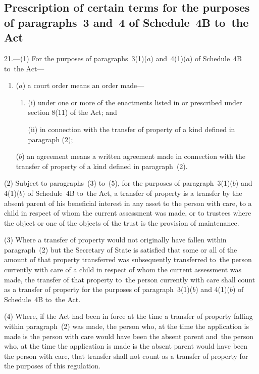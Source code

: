 \documentclass[12pt,a4paper]{article}
\begin{document}
\subsection[21. Prescription of certain terms for the
purposes of paragraphs~3 and~4 of Schedule~4B to~the Act]{Prescription of certain terms for the
purposes of paragraphs~3 and~4 of Schedule~4B to~the Act}

21.—(1) For the purposes
of paragraphs~3(1)($a$) and~4(1)($a$) of Schedule~4B to~the Act—
\begin{enumerate}\item[]
($a$) a court order means an order made—
\begin{enumerate}\item[]
(i) under one or more of the enactments listed in or prescribed under section
8(11) of the Act; and

(ii) in connection with the transfer of property of a kind defined in paragraph
(2);
\end{enumerate}

($b$) an agreement means a written agreement made in connection with the transfer
of property of a kind defined in paragraph~(2).
\end{enumerate}

(2) Subject to paragraphs~(3) to~(5), for the purposes of paragraph~3(1)($b$) and
4(1)($b$) of Schedule~4B to~the Act, a transfer of property is a transfer by the
absent parent of his beneficial interest in any asset to the person with care,
to a child in respect of whom the current assessment was made, or to trustees
where the object or one of the objects of the trust is the provision of
maintenance.%

(3) Where a transfer of property would not originally have fallen within
paragraph~(2) but the Secretary of State is satisfied that some or all of the
amount of that property transferred was subsequently transferred to~the person
currently with care of a child in respect of whom the current assessment was
made, the transfer of that property to~the person currently with care shall
count as a transfer of property for the purposes of paragraph~3(1)($b$) and
4(1)($b$) of Schedule~4B to~the Act.

(4) Where, if the Act had been in force at the time a transfer of property
falling within paragraph~(2) was made, the person who, at the time the
application is made is the person with care would have been the absent parent
and~the person who, at the time the application is made is the absent parent
would have been the person with care, that transfer shall not count as a
transfer of property for the purposes of this regulation.
\end{document}
